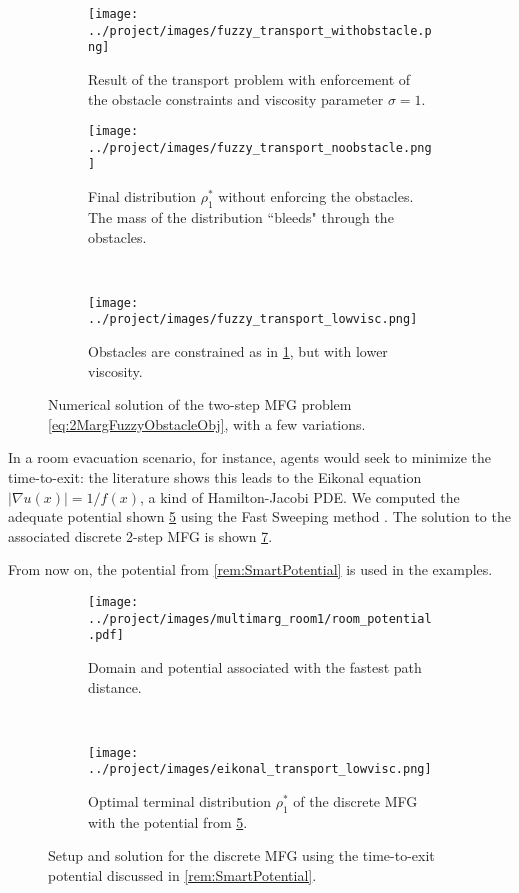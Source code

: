 \documentclass[../report.tex]{subfiles}
\begin{document}
\begin{figure}[!h]
	\centering
	\begin{subfigure}[t]{.62\linewidth}
	\texttt{[image: ../project/images/fuzzy\_transport\_withobstacle.png]}
	\caption{Result of the transport problem with enforcement of the obstacle constraints and viscosity parameter $\sigma=1$.}\label{fig:2MargFuzzyTransportObstacles}
	\end{subfigure}
	\begin{subfigure}[t]{.3\linewidth}
	\centering
	\texttt{[image: ../project/images/fuzzy\_transport\_noobstacle.png]}
	\caption{Final distribution $\rho^*_1$ without enforcing the obstacles. The mass of the distribution ``bleeds" through the obstacles. }\label{fig:2MargFuzzyTransportRelaxedObst}
	\end{subfigure}~
	\begin{subfigure}[t]{.3\linewidth}
	\centering
	\texttt{[image: ../project/images/fuzzy\_transport\_lowvisc.png]}
	\caption{Obstacles are constrained as in \cref{fig:2MargFuzzyTransportObstacles}, but with lower viscosity.}\label{fig:2MargFuzzyTransportLowVisc}
	\end{subfigure}
	\caption{Numerical solution of the two-step MFG problem \eqref{eq:2MargFuzzyObstacleObj}, with a few variations.}\label{fig:2MargFuzzyTransportMarginals}
\end{figure}

\begin{remark}\label{rem:SmartPotential}
In a room evacuation scenario, for instance, agents would seek to minimize the time-to-exit: the literature shows this leads to the Eikonal equation $|\nabla u(x)| = 1/f(x)$, a kind of Hamilton-Jacobi PDE. We computed the adequate potential shown \cref{fig:CrowdShortedPathPotential} using the Fast Sweeping method \parencite{Zhao2004AFS}. The solution to the associated discrete 2-step MFG is shown \cref{fig:2MargEikonalGame}.
\end{remark}

From now on, the potential from \cref{rem:SmartPotential} is used in the examples.

\begin{figure}[!h]
	\centering
	\begin{subfigure}[b]{.4\linewidth}
		\centering
		\texttt{[image: ../project/images/multimarg\_room1/room\_potential.pdf]}
		\caption{Domain and potential associated with the fastest path distance.}\label{fig:CrowdShortedPathPotential}
	\end{subfigure}~
	\begin{subfigure}[b]{.36\linewidth}
		\centering
		\texttt{[image: ../project/images/eikonal\_transport\_lowvisc.png]}
		\caption{Optimal terminal distribution $\rho^*_1$ of the discrete MFG with the potential from \cref{fig:CrowdShortedPathPotential}.}\label{fig:2MargEikonalGame}
	\end{subfigure}
	\caption{Setup and solution for the discrete MFG using the time-to-exit potential discussed in \cref{rem:SmartPotential}.}
\end{figure}
\end{document}
